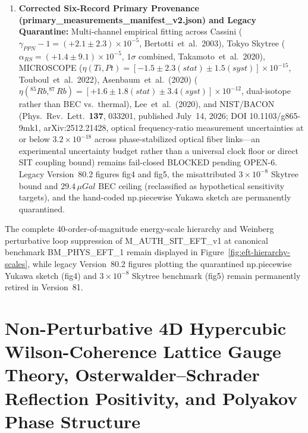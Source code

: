 \documentclass[american,11pt,letterpaper]{article}
\def\mathrm#1{#1}%
\def\texttt#1{#1}%
\def\emph#1{#1}%
\begin{document}
\begin{enumerate}[leftmargin=2em]
  \item \textbf{Corrected Six-Record Primary Provenance (\texttt{primary\_measurements\_manifest\_v2.json}) and Legacy Quarantine:} Multi-channel empirical fitting across Cassini ($\gamma_{\mathrm{PPN}}-1 = (+2.1\pm 2.3)\times 10^{-5}$, Bertotti~\emph{et~al.}\ 2003), Tokyo Skytree ($\alpha_{\mathrm{RS}} = (+1.4\pm 9.1)\times 10^{-5}$, $1\sigma$ combined, Takamoto~\emph{et~al.}\ 2020), MICROSCOPE ($\eta(\mathrm{Ti,Pt}) = [-1.5\pm 2.3(\mathrm{stat})\pm 1.5(\mathrm{syst})]\times 10^{-15}$, Touboul~\emph{et~al.}\ 2022), Asenbaum~\emph{et~al.}\ (2020) ($\eta(^{85}\mathrm{Rb},^{87}\mathrm{Rb}) = [+1.6\pm 1.8(\mathrm{stat})\pm 3.4(\mathrm{syst})]\times 10^{-12}$, dual-isotope rather than BEC vs.\ thermal), Lee~\emph{et~al.}\ (2020), and NIST/BACON (\emph{Phys.\ Rev.\ Lett.}\ \textbf{137}, 033201, published July~14, 2026; DOI \texttt{10.1103/g865-9mk1}, \texttt{arXiv:2512.21428}, optical frequency-ratio measurement uncertainties at or below $3.2\times 10^{-18}$ across phase-stabilized optical fiber links---an experimental uncertainty budget rather than a universal clock floor or direct SIT coupling bound) remains fail-closed \texttt{BLOCKED} pending \texttt{OPEN-6}. Legacy Version~80.2 figures \texttt{fig4} and \texttt{fig5}, the misattributed $3\times 10^{-8}$ Skytree bound and $29.4\,\mu\mathrm{Gal}$ BEC ceiling (reclassified as hypothetical sensitivity targets), and the hand-coded \texttt{np.piecewise} Yukawa sketch are permanently quarantined.
\end{enumerate}

The complete 40-order-of-magnitude energy-scale hierarchy and Weinberg perturbative loop suppression of \texttt{M\_AUTH\_SIT\_EFT\_v1} at canonical benchmark \texttt{BM\_PHYS\_EFT\_1} remain displayed in Figure~\ref{fig:eft-hierarchy-scales}, while legacy Version~80.2 figures plotting the quarantined \texttt{np.piecewise} Yukawa sketch (\texttt{fig4}) and $3\times 10^{-8}$ Skytree benchmark (\texttt{fig5}) remain permanently retired in Version~81.
\section{Non-Perturbative 4D Hypercubic Wilson-Coherence Lattice Gauge Theory, Osterwalder--Schrader Reflection Positivity, and Polyakov Phase Structure}
\label{sec:stage4-lattice}
\end{document}
